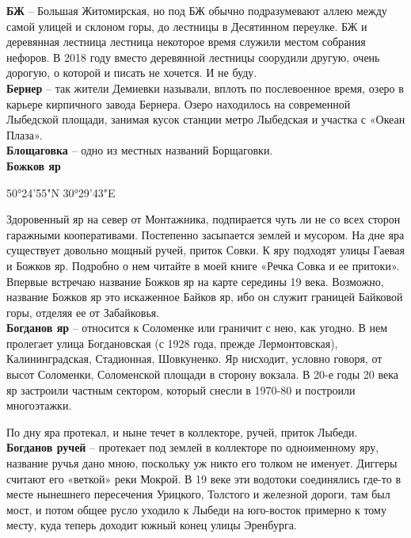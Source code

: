 \textbf{БЖ} – Большая Житомирская, но под БЖ обычно подразумевают аллею между самой улицей и склоном горы, до лестницы в Десятинном переулке. БЖ и деревянная лестница лестница некоторое время служили местом собрания нефоров. В 2018 году вместо деревянной лестницы соорудили другую, очень дорогую, о которой и писать не хочется. И не буду.\\

\textbf{Бернер} – так жители Демиевки называли, вплоть по послевоенное время, озеро в карьере кирпичного завода Бернера. Озеро находилось на современной Лыбедской площади, занимая кусок станции метро Лыбедская и участка с «Океан Плаза».\\ 

\textbf{Блощаговка} – одно из местных названий Борщаговки.\\

\textbf{Божков яр} 

50°24'55"N 30°29'43"E

Здоровенный яр на север от Монтажника, подпирается чуть ли не со всех сторон гаражными кооперативами. Постепенно засыпается землей и мусором. На дне яра существует довольно мощный ручей, приток Совки. К яру подходят улицы Гаевая и Божков яр. Подробно о нем читайте в моей книге «Речка Совка и ее притоки». Впервые встречаю название Божков яр на карте середины 19 века. Возможно, название Божков яр это искаженное Байков яр, ибо он служит границей Байковой горы, отделяя ее от Забайковья.\\

\textbf{Богданов яр} – относится к Соломенке или граничит с нею, как угодно. В нем пролегает улица Богдановская (с 1928 года, прежде Лермонтовская), Калининградская, Стадионная, Шовкуненко. Яр нисходит, условно говоря, от высот Соломенки, Соломенской площади в сторону вокзала. В 20-е годы 20 века яр застроили частным сектором, который снесли в 1970-80 и построили многоэтажки.

По дну яра протекал, и ныне течет в коллекторе, ручей, приток Лыбеди.\\ 

\textbf{Богданов ручей} – протекает под землей в коллекторе по одноименному яру, название ручья дано мною, поскольку уж никто его толком не именует. Диггеры считают его «веткой» реки Мокрой. В 19 веке эти водотоки соединялись где-то в месте нынешнего пересечения Урицкого, Толстого и железной дороги, там был мост, и потом общее русло уходило к Лыбеди на юго-восток примерно к тому месту, куда теперь доходит южный конец улицы Эренбурга.

